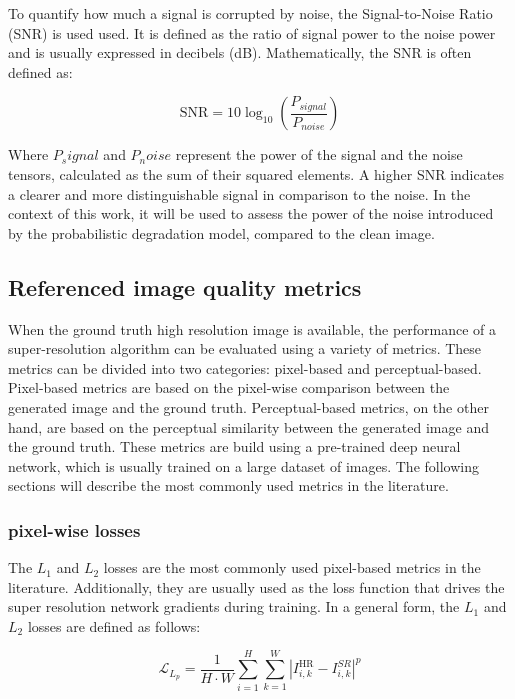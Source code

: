         To quantify how much a signal is corrupted by noise, the Signal-to-Noise Ratio (SNR) is used used. It is defined as the ratio of signal power to the noise power and is usually expressed in decibels (dB). Mathematically, the SNR is often defined as:

        \[ \text{SNR} = 10 \log_{10} \left( \frac{P_{signal}}{P_{noise}} \right) \]

        Where $P_signal$ and $P_noise$ represent the power of the signal and the noise tensors, calculated as the sum of their squared elements.
        A higher SNR indicates a clearer and more distinguishable signal in comparison to the noise. In the context of this work, it will be used to assess the power of the noise introduced by the probabilistic degradation model, compared to the clean image.

    \subsection{Referenced image quality metrics}

        When the ground truth high resolution image is available, the performance of a super-resolution algorithm can be evaluated using a variety of metrics. 
        These metrics can be divided into two categories: pixel-based and perceptual-based.
        Pixel-based metrics are based on the pixel-wise comparison between the generated image and the ground truth. 
        Perceptual-based metrics, on the other hand, are based on the perceptual similarity between the generated image and the ground truth. 
        These metrics are build using a pre-trained deep neural network, which is usually trained on a large dataset of images.
        The following sections will describe the most commonly used metrics in the literature.

        \subsubsection{pixel-wise losses}

            The $L_1$ and $L_2$ losses are the most commonly used pixel-based metrics in the literature. 
            Additionally, they are usually used as the loss function that drives the super resolution network gradients during training. 
            In a general form, the $L_1$ and $L_2$ losses are defined as follows:

            \begin{equation}
                \mathcal{L}_{L_p} = \frac{1}{H \cdot W} \sum_{i=1}^{H} \sum_{k=1}^{W} |I^{\text{HR}}_{i,k} - I^{SR}_{i,k}|^p
            \end{equation}

